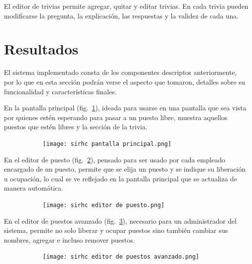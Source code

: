 \documentclass{article}
\begin{document}
El editor de trivias permite agregar, quitar y editar trivias. En cada trivia pueden modificarse la pregunta, la explicación, las respuestas y la validez de cada una.
\newpage
\section{Resultados}
El sistema implementado consta de los componentes descriptos anteriormente, por lo que en esta sección podrán verse el aspecto que tomaron, detalles sobre su funcionalidad y características finales.

En la pantalla principal (fig.~\ref{fig:pantallaPrincipal}), ideada para usarse en una pantalla que sea vista por quienes estén esperando para pasar a un puesto libre, muestra aquellos puestos que estén libres y la sección de la trivia.
\begin{figure}[H]
	\caption{Interfaz de la pantalla principal del sistema}
    \begin{subfigure}{1\textwidth}
	\texttt{[image: sirhc pantalla principal.png]}
    \end{subfigure}
	\label{fig:pantallaPrincipal}
\end{figure}
\vspace{-1.0\baselineskip}
En el editor de puesto (fig.~\ref{fig:editorPuesto}), pensado para ser usado por cada empleado encargado de un puesto, permite que se elija un puesto y se indique su liberación u ocupación, lo cual se ve reflejado en la pantalla principal que se actualiza de manera automática.
\begin{figure}[H]
	\caption{Interfaz del editor de puesto}
    \begin{subfigure}{1\textwidth}
	\texttt{[image: sirhc editor de puesto.png]}
    \end{subfigure}
	\label{fig:editorPuesto}
\end{figure}
\vspace{-1.0\baselineskip}
En el editor de puestos avanzado (fig.~\ref{fig:editorPuestosAvanzado}), necesario para un administrador del sistema, permite no solo liberar y ocupar puestos sino también cambiar sus nombres, agregar e incluso remover puestos.
\begin{figure}[H]
	\caption{Interfaz del editor de puestos avanzado}
    \begin{subfigure}{1\textwidth}
	\texttt{[image: sirhc editor de puestos avanzado.png]}
    \end{subfigure}
	\label{fig:editorPuestosAvanzado}
\end{figure}
\end{document}
